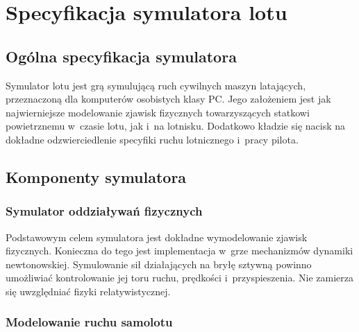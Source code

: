 \documentclass{mwrep}
\begin{document}
\chapter{Specyfikacja symulatora lotu}

\section{Ogólna specyfikacja symulatora}

Symulator lotu jest grą symulującą ruch cywilnych maszyn latających, przeznaczoną dla komputerów osobistych klasy PC. Jego założeniem jest jak najwierniejsze modelowanie zjawisk fizycznych towarzyszących statkowi powietrznemu w~czasie lotu, jak i~na lotnisku. Dodatkowo kładzie się nacisk na dokładne odzwierciedlenie specyfiki ruchu lotnicznego i~pracy pilota.

\section{Komponenty symulatora}

\subsection{Symulator oddziaływań fizycznych}

Podstawowym celem symulatora jest dokładne wymodelowanie zjawisk fizycznych. Konieczna do tego jest implementacja w~grze mechanizmów dynamiki newtonowskiej. Symulowanie sił działających na bryłę sztywną powinno umożliwiać kontrolowanie jej toru ruchu, prędkości i~przyspieszenia. Nie zamierza się uwzględniać fizyki relatywistycznej.

\subsection{Modelowanie ruchu samolotu}
\end{document}
